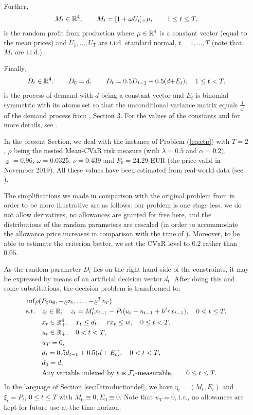 \documentclass{article}              %
\begin{document}
Further,
\[
M_{t}\in \mathbb{R}^4,\qquad M_{t}=[1+ \omega U_{t}]_{+}\mu,\qquad1\leq t\leq T,
\]
is the random profit from production where $\mu\in\mathbb{R}^{4}$ is a
constant vector (equal to the mean prices) and $U_1,\dots,U_T$ are i.i.d. standard normal, $t=1,\dots,T$ (note that $M_t$ are i.i.d.).

Finally,
\[
D_{t}\in \mathbb{R}^4,\qquad D_{0}=d,\qquad D_{t}=0.5D_{t-1}+0.5(d\text{+\ensuremath{E_{t})}},\quad1\leq t<T,
\]
is the process of demand with $d$ being a
constant vector and $E_{t}$ is binomial symmetric with its atoms set so that the
unconditional variance matrix equals $\frac{1}{4^2}$ of the demand process from \cite{zapletal2019multi}, Section 3. For the values of the constants and for more details, see \cite{zapletal2019multi}. 

In the present Section, we deal with the instance of Problem (\ref{eq:etp}) with  $T=2$, $\rho$ being the nested Mean-CVaR risk measure (with $\lambda=0.5$
and $\alpha=0.2)$,  $\varrho=0.96$, 
$\omega = 0.0325$, $\nu=0.439$ and $P_{0}=24.29$ EUR (the price
valid in November 2019). All these values have been estimated from real-world data (see \cite{zapletal2019multi}).

The simplifications we made in comparison with the original problem from \cite{zapletal2019multi} in order to be more illustrative are as follows: our problem is one stage less, we do not allow derivatives, no allowances are granted for free here, and the distributions of the random parameters are rescaled (in order to accommodate the allowance price increases in comparison with the time of \cite{zapletal2019multi}). Moreover, to be able to estimate the criterion better, we set the $\mathrm{CVaR}$ level to $0.2$ rather than $0.05$. 

As the random parameter $D_{t}$ lies on the right-hand side of the
constraints, it may be expressed by means of an artificial decision vector
$d_{t}$. After doing this and some substitutions, the decision problem
is transformed to: 
\begin{align*}
\inf & \rho(P_{0}u_{0},-\varrho z_{1},\dots,-\varrho^{T}z_{T})\\
\text{s.t.} &\quad  z_{t}\in \mathbb{R},\quad  z_{t}=M'_{t}x_{t-1}-P_{t}(u_t-u_{t-1}+h'rx_{t-1}),\quad  0<t\leq T,\\
 &\quad  x_{t}\in\mathbb{R}_{+}^{4},\quad  x_{t}\leq d_{t},\quad  rx_{t}\leq w,\quad  0\leq t<T,\\
 &\quad  u_{t}\in\mathbb{R}_{+},\quad  0<t<T,\\
 &\quad  u_{T}=0,\\
 &\quad  d_{t}=0.5d_{t-1}+0.5(d+E_{t}),\quad  0<t<T,\\
 &\quad  d_{0}=d,\nonumber\\
 &\quad \text{Any variable indexed by $t$ is $\mathcal{F}_t$-measurable,}\qquad 0\leq t\leq T. \nonumber 
\end{align*}
In the language of Section \ref{sec:Ihtroductiondef}, we have $\eta_{t}=(M_{t},E_{t})$
and $\xi_{t}=P_{t}$, $0\leq t\leq T$ with $M_{0}\equiv0,$$E_{0}\equiv0$. Note that $u_T=0$, i.e.,  no allowances are kept for future use at the time horizon.
\end{document}
